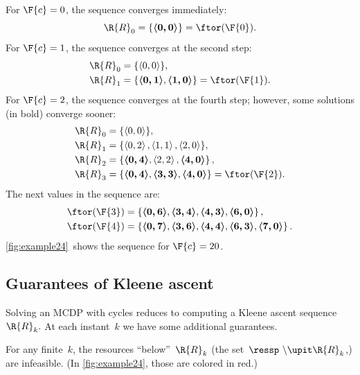 \noindent For $\F{c}=0$, the sequence converges immediately:
\[
\R{R}_{0}=\{\boldsymbol{\left\langle 0,0\right\rangle }\}=\ftor(\F{0}).
\]
 For $\F{c}=1$, the sequence converges at the second step:
\begin{align*}
\R{R}_{0} & =\{\left\langle 0,0\right\rangle \},\\
\R{R}_{1} & =\{\boldsymbol{\left\langle 0,1\right\rangle },\boldsymbol{\left\langle 1,0\right\rangle }\}=\ftor(\F{1}).
\end{align*}
For $\F{c}=2$, the sequence converges at the fourth step; however,
some solutions (in bold) converge sooner:
\begin{align*}
\R{R}_{0} & =\{\left\langle 0,0\right\rangle \},\\
\R{R}_{1} & =\{\left\langle 0,2\right\rangle ,\left\langle 1,1\right\rangle ,\left\langle 2,0\right\rangle \},\\
\R{R}_{2} & =\left\{ \boldsymbol{\left\langle 0,4\right\rangle },\left\langle 2,2\right\rangle ,\boldsymbol{\left\langle 4,0\right\rangle }\right\} ,\\
\R{R}_{3} & =\{\boldsymbol{\left\langle 0,4\right\rangle },\boldsymbol{\left\langle 3,3\right\rangle },\boldsymbol{\left\langle 4,0\right\rangle }\}=\ftor(\F{2}).
\end{align*}
The next values in the sequence are:
\begin{align*}
\ftor(\F{3}) & =\left\{ \boldsymbol{\left\langle 0,6\right\rangle },\boldsymbol{\left\langle 3,4\right\rangle },\boldsymbol{\left\langle 4,3\right\rangle },\boldsymbol{\left\langle 6,0\right\rangle }\right\} ,\\
\ftor(\F{4}) & =\left\{ \boldsymbol{\left\langle 0,7\right\rangle },\boldsymbol{\left\langle 3,6\right\rangle },\boldsymbol{\left\langle 4,4\right\rangle },\boldsymbol{\left\langle 6,3\right\rangle },\boldsymbol{\left\langle 7,0\right\rangle }\right\} .
\end{align*}
\cref{fig:example24}~shows the sequence for $\F{c}=20$.

\subsection{Guarantees of Kleene ascent}

\noindent Solving an MCDP with cycles reduces to computing a Kleene
ascent sequence~$\R{R}_{k}.$ At each instant~$k$ we have some
additional guarantees.

For any finite~$k$, the resources ``below''~$\R{R}_{k}$ (the
set~$\ressp\ \backslash\upit\R{R}_{k}$,) are infeasible. (In \cref{fig:example24},
those are colored in red.)


